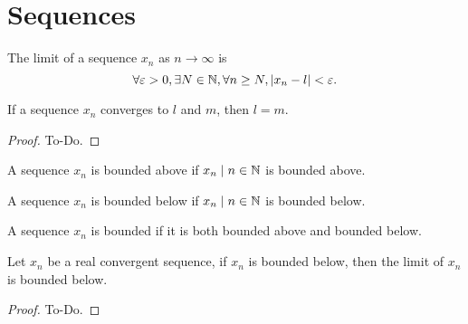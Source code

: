 \chapter{Sequences}

\begin{definition}\label{def:seqlimit}
     \leanok
    The limit of a sequence $x_n$ as $n \to \infty$ is
    \[
    \forall \varepsilon > 0, \exists N \in \mathbb{N}, \forall n \geq N, |x_n - l| < \varepsilon.
    \]
\end{definition}

\begin{theorem}\label{thm:seqlimitunique}
     \leanok
    If a sequence $x_n$ converges to $l$ and $m$,
    then $l = m$.
\end{theorem}
\begin{proof}
    To-Do.
\end{proof}

\begin{definition}\label{def:seqboundabove}
     \leanok
    A sequence $x_n$ is bounded above if ${x_n \mid n \in \mathbb{N}}$ is bounded above.
\end{definition}

\begin{definition}\label{def:seqboundbelow}
     \leanok
    A sequence $x_n$ is bounded below if ${x_n \mid n \in \mathbb{N}}$ is bounded below.
\end{definition}

\begin{definition}\label{def:seqbound}
     \leanok
    A sequence $x_n$ is bounded if it is both bounded above and bounded below.
\end{definition}

\begin{lemma}\label{lem:seqboundbelow_limboundbelow}
     \leanok
    Let $x_n$ be a real convergent sequence,
    if $x_n$ is bounded below,
    then the limit of $x_n$ is bounded below.
\end{lemma}
\begin{proof}
    To-Do.
\end{proof}


